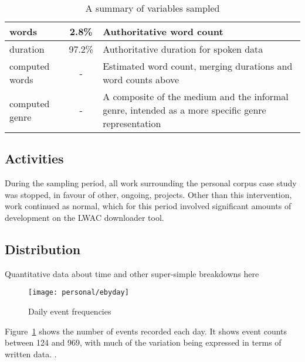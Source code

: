 \begin{table}[hp]
\begin{tabular}{ | l | c | p{7cm} |}
    words               & 2.8\% & Authoritative word count\\ \hline
    duration            & 97.2\% & Authoritative duration for spoken data\\ \hline
    computed words      & - & Estimated word count, merging durations and word counts above\\ \hline
    computed genre      & - & A composite of the medium and the informal genre, intended as a more specific genre representation \\
    \hline
    \end{tabular}
\caption{A summary of variables sampled}
\label{table:personal:variables}
\end{table}





\subsection{Activities}
During the sampling period, all work surrounding the personal corpus case study was stopped, in favour of other, ongoing, projects.  Other than this intervention, work continued as normal, which for this period involved significant amounts of development on the LWAC downloader tool.







\subsection{Distribution}
Quantitative data about time and other super-simple breakdowns here



\begin{figure}[hp]
    \centering
    \texttt{[image: personal/ebyday]}
    \caption{Daily event frequencies}
    \label{fig:personal:eventcountbyday}
\end{figure}


Figure~\ref{fig:personal:eventcountbyday} shows the number of events recorded each day.  It shows event counts between 124 and 969, with much of the variation being expressed in terms of written data.  .

